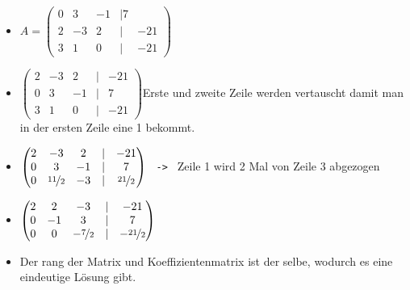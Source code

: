 \documentclass{article}
\begin{document}
\begin{itemize}
\begin{itemize}
			\begin{itemize}
				\item{$A=\begin{pmatrix} 0 & 3 & -1 & | 7 \\ 2 & -3 & 2 & | & -21 \\ 3 & 1 & 0 & | & -21 \end{pmatrix}$}
				\item{$\begin{pmatrix} 2 & -3 & 2 & | & -21 \\ 0 & 3 & -1 & | & 7 \\ 3 & 1 & 0 & | & -21 \end{pmatrix}$Erste und zweite Zeile werden vertauscht damit man in der ersten Zeile eine 1 bekommt.}
				\item{$\begin{pmatrix} 2 & -3 & 2 & | & -21 \\ 0 & 3 & -1 & | & 7 \\ 0 & \nicefrac{11}{2} & -3 & | & \nicefrac{21}{2} \end{pmatrix}$ \texttt{ -> } Zeile 1 wird 2 Mal von Zeile 3 abgezogen}
				\item{$\begin{pmatrix} 2 & 2 & -3 & | & -21 \\ 0 & -1 & 3 & | & 7 \\ 0 & 0 & -\nicefrac{7}{2} & | & -\nicefrac{21}{2} \end{pmatrix}$}
				\item{Der rang der Matrix und Koeffizientenmatrix ist der selbe, wodurch es eine eindeutige Lösung gibt.}


\end{itemize}
\end{itemize}
\end{itemize}
\end{document}
